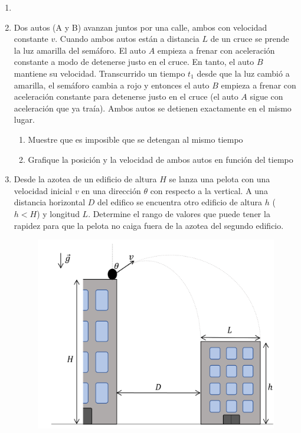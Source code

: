 \documentclass[letterpaper,11pt]{article}
\begin{document}
\vspace{-1cm}
\begin{enumerate}\setlength{\itemsep}{0.4cm}


\item[]

\item Dos autos (A y B) avanzan juntos por una calle, ambos con velocidad constante $v$. Cuando ambos autos están a distancia $L$ de un cruce se prende la luz amarilla del semáforo. El auto $A$ empieza a frenar con aceleración constante a modo de detenerse justo en el cruce. En tanto, el auto $B$ mantiene su velocidad. Transcurrido un tiempo $t_1$ desde que la luz cambió a amarilla, el semáforo cambia a rojo y entonces el auto $B$ empieza a frenar con aceleración constante para detenerse justo en el cruce (el auto $A$ sigue con aceleración que ya traía). Ambos autos se detienen exactamente en el mismo lugar.

\begin{enumerate}
    \item Muestre que es imposible que se detengan al mismo tiempo
    
    \item Grafique la posición y la velocidad de ambos autos en función del tiempo
\end{enumerate}

\item Desde la azotea de un edificio de altura $H$ se lanza una pelota con una velocidad inicial $v$ en una dirección $\theta$ con respecto a la vertical. A una distancia horizontal $D$ del edifico se encuentra otro edificio de altura $h$ ($h < H$) y longitud $L$. Determine el rango de valores que puede tener la rapidez para que la pelota no caiga fuera de la azotea del segundo edificio.

\begin{figure}[H]
    \centering
    \includegraphics[width=0.4\linewidth]{2023-1/img/TD 1/edificios.png}
\end{figure}


\end{enumerate}
\end{document}
